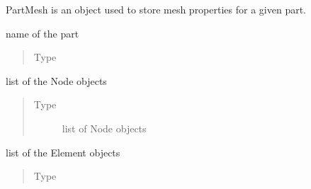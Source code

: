 \documentclass[letterpaper,10pt,english]{sphinxmanual}
\begin{document}
\begin{fulllineitems}
\label{\detokenize{pyCofea/api:cofea.PartMesh}}
PartMesh is an object used to store mesh properties for a given part.

\begin{fulllineitems}
\label{\detokenize{pyCofea/api:cofea.PartMesh.name}}
name of the part
\begin{quote}\begin{description}
\item[{Type}] \leavevmode
{}

\end{description}\end{quote}

\end{fulllineitems}


\begin{fulllineitems}
\label{\detokenize{pyCofea/api:cofea.PartMesh.nodes}}
list of the Node objects
\begin{quote}\begin{description}
\item[{Type}] \leavevmode
list of Node objects

\end{description}\end{quote}

\end{fulllineitems}


\begin{fulllineitems}
\label{\detokenize{pyCofea/api:cofea.PartMesh.elements}}
list of the Element objects
\begin{quote}\begin{description}
\item[{Type}] \leavevmode
{}


\end{description}
\end{quote}
\end{fulllineitems}
\end{fulllineitems}
\end{document}
